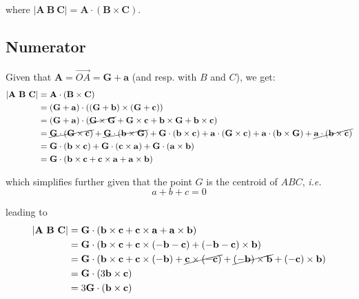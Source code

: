 \documentclass[10pt,a4paper]{article}
\newcommand{\lvec}[1]{\overrightarrow{#1}}
\newcommand{\vA}{\mathbf{A}}
\newcommand{\vB}{\mathbf{B}}
\newcommand{\vC}{\mathbf{C}}
\newcommand{\vG}{\mathbf{G}}
\newcommand{\va}{\mathbf{a}}
\newcommand{\vb}{\mathbf{b}}
\newcommand{\vc}{\mathbf{c}}
\begin{document}
where $\left| \mathbf{A \ B \ C}\right| = \mathbf{A} \cdot (\mathbf{B} \times \mathbf{C})$.



  \subsection{Numerator}

Given that $\vA = \lvec{OA} = \vG + \va$ (and resp. with $B$ and $C$), we get:
\begin{align*}
  \left| \mathbf{A \ B \ C}\right|
  & = \vA \cdot (\vB \times \vC) \\
  & = (\vG + \va) \cdot ( (\vG + \vb) \times (\vG + \vc) ) \\
  & = (\vG + \va) \cdot (  \cancel{\vG \times \vG}
                         + \vG \times \vc
                         + \vb \times \vG
                         + \vb \times \vc) \\
  & = \cancel{\vG \cdot (\vG \times \vc)}
    + \cancel{\vG \cdot (\vb \times \vG)}
    + \vG \cdot (\vb \times \vc)
    + \va \cdot (\vG \times \vc)
    + \va \cdot (\vb \times \vG)
    + \cancel{\va \cdot (\vb \times \vc)} \\
  & = \vG \cdot (\vb \times \vc)
    + \vG \cdot (\vc \times \va)
    + \vG \cdot (\va \times \vb) \\
  & = \vG \cdot \left(  \vb \times \vc
                      + \vc \times \va
                      + \va \times \vb \right)
\end{align*}

which simplifies further given that the point $G$ is the centroid of $ABC$, \textit{i.e.}
\begin{equation}
  a + b + c= 0
  \label{eq:SAcentroid}
\end{equation}

leading to
\begin{align}
  \left| \mathbf{A \ B \ C}\right|
  & = \vG \cdot \left(  \vb \times \vc
                      + \vc \times \va
                      + \va \times \vb \right)
  \nonumber \\
  & = \vG \cdot \left(  \vb \times \vc
                      + \vc \times (-\vb-\vc)
                      + (-\vb - \vc) \times \vb \right)
  \nonumber \\
  & = \vG \cdot \left(  \vb \times \vc
                      + \vc \times (-\vb)
                      + \cancel{\vc \times (-\vc)}
                      + \cancel{(-\vb) \times \vb}
                      + (-\vc) \times \vb \right)
  \nonumber \\
  & = \vG \cdot \left(3 \vb \times \vc \right) \nonumber \\
  & = 3 \vG \cdot \left( \vb \times \vc \right)
  \label{eq:SAnumeratorSimplified}
\end{align}
\end{document}
